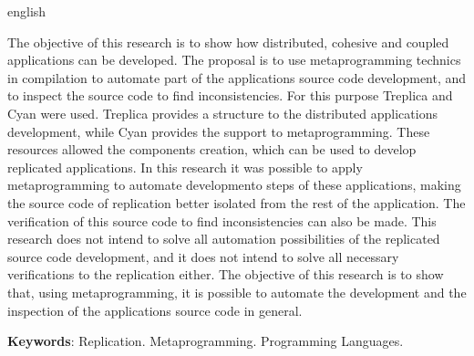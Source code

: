 \begin{resumo}[Abstract]
 \begin{otherlanguage*}{english}

The objective of this research is to show how distributed, cohesive and coupled applications can be developed. The proposal is to use metaprogramming technics in compilation to automate part of the applications source code development, and to inspect the source code to find inconsistencies. For this purpose Treplica and Cyan were used. Treplica provides a structure to the distributed applications development, while Cyan provides the support to metaprogramming. These resources allowed the components creation, which can be used to develop replicated applications. In this research it was possible to apply metaprogramming to automate developmento steps of these applications, making the source code of replication better isolated from the rest of the application. The verification of this source code to find inconsistencies can also be made. This research does not intend to solve all automation possibilities of the replicated source code development, and it does not intend to solve all necessary verifications to the replication either. The objective of this research is to show that, using metaprogramming, it is possible to automate the development and the inspection of the applications source code in general.   

\textbf{Keywords}: Replication. Metaprogramming. Programming Languages.

 \end{otherlanguage*}
\end{resumo}

